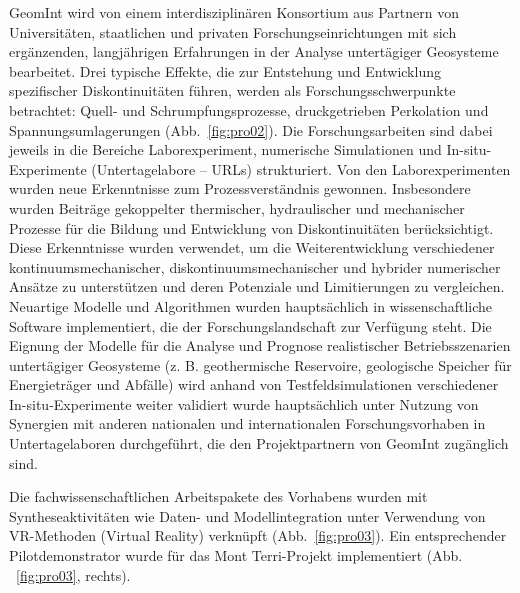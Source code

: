 GeomInt wird von einem interdisziplinären Konsortium aus Partnern von Universitäten, staatlichen und privaten Forschungseinrichtungen mit sich ergänzenden, langjährigen Erfahrungen in der Analyse untertägiger Geosysteme bearbeitet. Drei typische Effekte, die zur Entstehung und Entwicklung spezifischer Diskontinuitäten führen, werden als Forschungsschwerpunkte betrachtet: Quell- und Schrumpfungsprozesse, druckgetrieben Perkolation und Spannungsumlagerungen (Abb.~\ref{fig:pro02}). 
Die Forschungsarbeiten sind dabei jeweils in die Bereiche Laborexperiment, numerische Simulationen und In-situ-Experimente (Untertagelabore – URLs) strukturiert. Von den Laborexperimenten wurden neue Erkenntnisse zum Prozessverständnis gewonnen. Insbesondere wurden Beiträge gekoppelter thermischer, hydraulischer und mechanischer Prozesse für die Bildung und Entwicklung von Diskontinuitäten berücksichtigt. Diese Erkenntnisse wurden verwendet, um die Weiterentwicklung verschiedener kontinuumsmechanischer, diskontinuumsmechanischer und hybrider numerischer Ansätze zu unterstützen und deren Potenziale und Limitierungen zu vergleichen. Neuartige Modelle und Algorithmen wurden hauptsächlich in wissenschaftliche Software implementiert, die der Forschungslandschaft zur Verfügung steht. Die Eignung der Modelle für die Analyse und Prognose realistischer Betriebsszenarien untertägiger Geosysteme (z. B. geothermische Reservoire, geologische Speicher für Energieträger und Abfälle) wird anhand von Testfeldsimulationen verschiedener In-situ-Experimente weiter validiert wurde hauptsächlich unter Nutzung von Synergien mit anderen nationalen und internationalen Forschungsvorhaben in Untertagelaboren durchgeführt, die den Projektpartnern von GeomInt zugänglich sind.

Die fachwissenschaftlichen Arbeitspakete des Vorhabens wurden mit Syntheseaktivitäten wie Daten- und Modellintegration unter Verwendung von VR-Methoden (Virtual Reality) verknüpft (Abb.~\ref{fig:pro03}).
Ein entsprechender Pilotdemonstrator wurde für das Mont Terri-Projekt implementiert (Abb. ~\ref{fig:pro03}, rechts).



